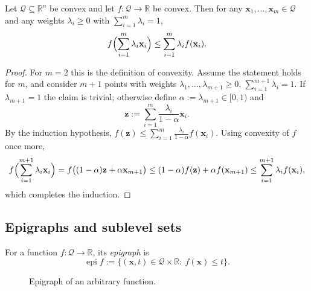 \begin{claim}
\label{clm:ch4-jensen}
Let $\mathcal{Q}\subseteq\mathbb{R}^n$ be convex and let $f:\mathcal{Q}\to\mathbb{R}$ be convex.
Then for any $\mathbf{x}_1,\ldots,\mathbf{x}_m\in\mathcal{Q}$ and any weights $\lambda_i\ge 0$ with $\sum_{i=1}^m\lambda_i=1$,
\[
  f\Bigl(\sum_{i=1}^m \lambda_i \mathbf{x}_i\Bigr)\le \sum_{i=1}^m \lambda_i f(\mathbf{x}_i).
\]
\end{claim}
\begin{proof}
For $m=2$ this is the definition of convexity. Assume the statement holds for $m$, and consider $m+1$ points with weights
$\lambda_1,\ldots,\lambda_{m+1}\ge 0$, $\sum_{i=1}^{m+1}\lambda_i=1$. If $\lambda_{m+1}=1$ the claim is trivial; otherwise define
$\alpha:=\lambda_{m+1}\in[0,1)$ and
\[
  \mathbf{z}:=\sum_{i=1}^{m}\frac{\lambda_i}{1-\alpha}\mathbf{x}_i.
\]
By the induction hypothesis,
$f(\mathbf{z})\le \sum_{i=1}^m \frac{\lambda_i}{1-\alpha} f(\mathbf{x}_i)$. Using convexity of $f$ once more,
\[
  f\Bigl(\sum_{i=1}^{m+1}\lambda_i\mathbf{x}_i\Bigr)
  =f\bigl((1-\alpha)\mathbf{z}+\alpha \mathbf{x}_{m+1}\bigr)
  \le (1-\alpha)f(\mathbf{z})+\alpha f(\mathbf{x}_{m+1})
  \le \sum_{i=1}^{m+1}\lambda_i f(\mathbf{x}_i),
\]
which completes the induction.
\end{proof}


\subsection{Epigraphs and sublevel sets}
\label{sec:ch4-epigraph}
\begin{definition}
For a function $f:\mathcal{Q}\to\mathbb{R}$, its \emph{epigraph} is
\[
  \operatorname{epi} f:=\{(\mathbf{x},t)\in\mathcal{Q}\times\mathbb{R}:\ f(\mathbf{x})\le t\}.
\]
\end{definition}

\begin{figure}[ht]
    \centering
    \caption{Epigraph of an arbitrary function.}
    \label{fig:epigraph}
\end{figure}


